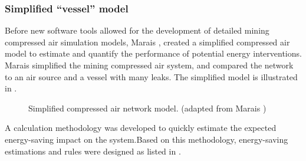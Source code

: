 		\subsubsection{Simplified \enquote{vessel} model}
		Before new software tools allowed for the development of detailed mining compressed air simulation models, Marais \cite{Marais2012PhD}, \cite{marais2013simplification} created a simplified compressed air model to estimate and quantify the performance of potential energy interventions. Marais simplified the mining compressed air system, and compared the network to an air source and a vessel with many leaks. The simplified model is illustrated in .
		\begin{figure}[h!]
			\centering
			\caption[Simplified compressed air netowrk model]{Simplified compressed air network model. (adapted from Marais \cite{Marais2012PhD})}
			\label{fig:Marais vessel model}
		\end{figure}
		\par 
		A calculation methodology was developed to quickly estimate the expected energy-saving impact on the system.Based on this methodology, energy-saving estimations and rules were designed as listed in . 
		\par 
		
